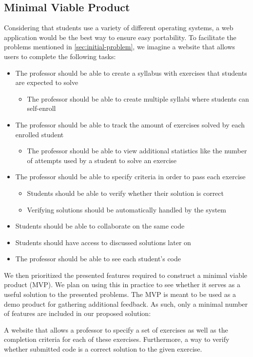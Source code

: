 \subsection{Minimal Viable Product}
Considering that students use a variety of different operating systems, a web application would be the best way to ensure easy portability.
To facilitate the problems mentioned in \ref{sec:initial-problem}, we imagine a website that allows users to complete the following tasks:
\begin{itemize}
	\item The professor should be able to create a syllabus with exercises that students are expected to solve
	\begin{itemize}
		\item The professor should be able to create multiple syllabi where students can self-enroll
	\end{itemize}
	\item The professor should be able to track the amount of exercises solved by each enrolled student
	\begin{itemize}
		\item The professor should be able to view additional statistics like the number of attempts used by a student to solve an exercise
	\end{itemize}
	\item The professor should be able to specify criteria in order to pass each exercise 
	\begin{itemize}
		\item Students should be able to verify whether their solution is correct
		\item Verifying solutions should be automatically handled by the system
	\end{itemize}
	\item Students should be able to collaborate on the same code
	\item Students should have access to discussed solutions later on
	\item The professor should be able to see each student's code
\end{itemize}

We then prioritized the presented features required to construct a minimal viable product (MVP).
We plan on using this in practice to see whether it serves as a useful solution to the presented problems. 
The MVP is meant to be used as a demo product for gathering additional feedback.
As such, only a minimal number of features are included in our proposed solution:

\begin{displayquote}
A website that allows a professor to specify a set of exercises as well as the completion criteria for each of these exercises. Furthermore, a way to verify whether submitted code is a correct solution to the given exercise.
\end{displayquote}





